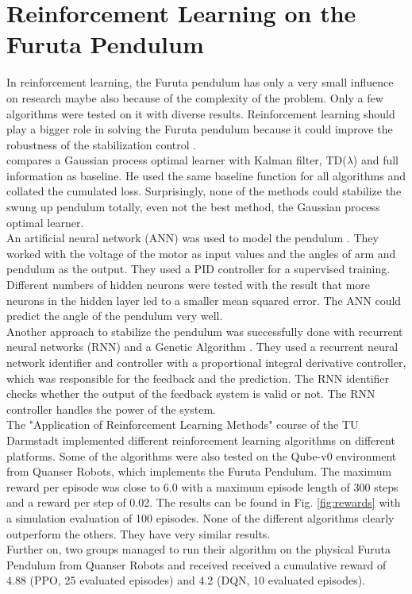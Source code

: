 \section{Reinforcement Learning on the Furuta Pendulum}
In reinforcement learning, the Furuta pendulum has only a very small influence 
on research maybe also because of the complexity of the 
problem. Only a few algorithms were tested on it with diverse results. 
Reinforcement learning should play a bigger role in solving the Furuta pendulum 
because it could improve the robustness of the stabilization control 
\citep{wang2004minimum}.\\
\cite{hennig2011optimal} compares a Gaussian process optimal learner with 
Kalman filter, TD($\lambda$) and full information as baseline. He used the same 
baseline function for all algorithms and collated the cumulated loss. 
Surprisingly, none of the methods could stabilize the swung up pendulum 
totally, even not the best method, the Gaussian process optimal learner.\\
An artificial neural network (ANN) was used to model the pendulum 
\citep{quyen2012rotary}. They worked with the voltage of the motor as input 
values and the angles of arm and pendulum as the output. They used a PID 
controller for a supervised training. Different numbers of 
hidden neurons were tested with the result that more neurons in the hidden 
layer led to a smaller mean squared error. The ANN could predict the angle of 
the pendulum very well.\\
Another approach to stabilize the pendulum was successfully done with recurrent 
neural 
networks (RNN) and a Genetic Algorithm 
\citep{shojaei2011hybrid}. They used a recurrent neural network identifier and 
controller with a proportional integral derivative controller, which was 
responsible for the feedback and the prediction. The RNN identifier checks 
whether the output of the feedback system is valid or not. The RNN controller 
handles the power of the system.\\
The "Application of Reinforcement Learning Methods" course of the TU Darmstadt 
implemented different reinforcement learning algorithms on different platforms. 
Some of the algorithms were also tested on the Qube-v0 environment from Quanser 
Robots, which implements the Furuta Pendulum. The maximum reward per 
episode was close to 6.0 with a maximum episode length of 300 steps and a 
reward per step of 0.02. The results can be 
found in Fig. \ref{fig:rewards} with a simulation evaluation of 100 episodes. 
None of the different algorithms clearly outperform the others. They have very 
similar results.\\
Further on, two groups managed to run their algorithm on the physical Furuta 
Pendulum from Quanser Robots and received received a cumulative reward of 4.88 
(PPO, 25 evaluated episodes) and 4.2 (DQN, 10 
evaluated episodes).  

